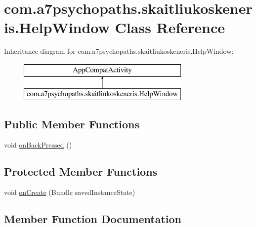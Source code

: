 \hypertarget{classcom_1_1a7psychopaths_1_1skaitliukoskeneris_1_1_help_window}{}\section{com.\+a7psychopaths.\+skaitliukoskeneris.\+Help\+Window Class Reference}
\label{classcom_1_1a7psychopaths_1_1skaitliukoskeneris_1_1_help_window}
Inheritance diagram for com.\+a7psychopaths.\+skaitliukoskeneris.\+Help\+Window\+:\begin{figure}[H]
\begin{center}
\leavevmode
\includegraphics[height=2.000000cm]{classcom_1_1a7psychopaths_1_1skaitliukoskeneris_1_1_help_window}
\end{center}
\end{figure}
\subsection*{Public Member Functions}
\begin{DoxyCompactItemize}
\item 
void \mbox{\hyperlink{classcom_1_1a7psychopaths_1_1skaitliukoskeneris_1_1_help_window_aa87d01e85fcc2e56b45d6ff5c24ecd40}{on\+Back\+Pressed}} ()
\end{DoxyCompactItemize}
\subsection*{Protected Member Functions}
\begin{DoxyCompactItemize}
\item 
void \mbox{\hyperlink{classcom_1_1a7psychopaths_1_1skaitliukoskeneris_1_1_help_window_a272adb54e310ca2214d4b8f7920ba7d4}{on\+Create}} (Bundle saved\+Instance\+State)
\end{DoxyCompactItemize}


\subsection{Member Function Documentation}
\mbox{\label{classcom_1_1a7psychopaths_1_1skaitliukoskeneris_1_1_help_window_aa87d01e85fcc2e56b45d6ff5c24ecd40}} 
